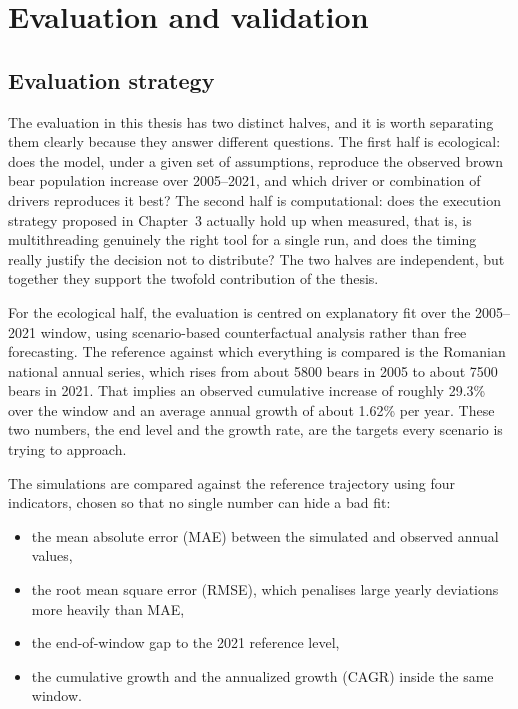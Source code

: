 \chapter{Evaluation and validation}
\label{ch:evaluation}

\section{Evaluation strategy}

The evaluation in this thesis has two distinct halves, and it is worth separating them clearly because they answer different questions. The first half is ecological: does the model, under a given set of assumptions, reproduce the observed brown bear population increase over 2005--2021, and which driver or combination of drivers reproduces it best? The second half is computational: does the execution strategy proposed in Chapter~3 actually hold up when measured, that is, is multithreading genuinely the right tool for a single run, and does the timing really justify the decision not to distribute? The two halves are independent, but together they support the twofold contribution of the thesis.

For the ecological half, the evaluation is centred on explanatory fit over the 2005--2021 window, using scenario-based counterfactual analysis rather than free forecasting. The reference against which everything is compared is the Romanian national annual series, which rises from about 5800 bears in 2005 to about 7500 bears in 2021. That implies an observed cumulative increase of roughly 29.3\% over the window and an average annual growth of about 1.62\% per year. These two numbers, the end level and the growth rate, are the targets every scenario is trying to approach.

The simulations are compared against the reference trajectory using four indicators, chosen so that no single number can hide a bad fit:

\begin{itemize}
    \item the mean absolute error (MAE) between the simulated and observed annual values,
    \item the root mean square error (RMSE), which penalises large yearly deviations more heavily than MAE,
    \item the end-of-window gap to the 2021 reference level,
    \item the cumulative growth and the annualized growth (CAGR) inside the same window.
\end{itemize}

